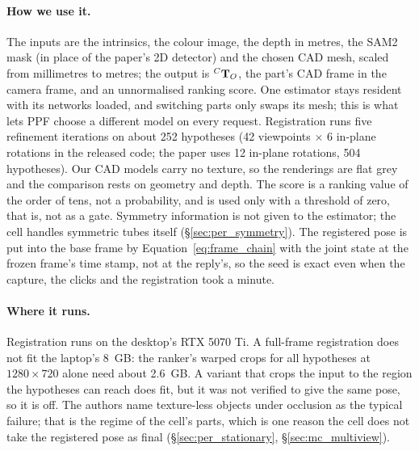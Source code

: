 \paragraph{How we use it.} The inputs are the intrinsics, the colour image, the depth in metres,
the SAM2 mask (in place of the paper's 2D detector) and the chosen CAD mesh, scaled from
millimetres to metres; the output is ${}^{C}\mathbf{T}_{O}$, the part's CAD frame in the camera frame, and an
unnormalised ranking score. One estimator stays resident with its networks loaded, and switching
parts only swaps its mesh; this is what lets PPF choose a different model on every request. Registration runs five refinement iterations on about 252 hypotheses (42
viewpoints $\times$ 6 in-plane rotations in the released code; the paper uses 12 in-plane rotations,
504 hypotheses). Our CAD models carry no texture, so the renderings are flat grey and the comparison
rests on geometry and depth. The score is a ranking value of the order of tens, not a probability,
and is used only with a threshold of zero, that is, not as a gate. Symmetry information is not given
to the estimator; the cell handles
symmetric tubes itself (\S\ref{sec:per_symmetry}). The registered pose is put into the base frame by
Equation~\ref{eq:frame_chain} with the joint state at the frozen frame's time stamp, not at the
reply's, so the seed is exact even when the capture, the clicks and the registration took a minute.

\paragraph{Where it runs.} Registration runs on the desktop's RTX 5070 Ti. A full-frame registration
does not fit the laptop's 8~GB: the ranker's warped crops for all hypotheses at $1280\times720$ alone
need about 2.6~GB. A variant that crops the input to the region the hypotheses can reach does fit,
but it was not verified to give the same pose, so it is off. The authors name texture-less objects
under occlusion as the typical failure; that is the regime of the cell's parts, which is one reason
the cell does not take the registered pose as final (\S\ref{sec:per_stationary},
\S\ref{sec:mc_multiview}).

